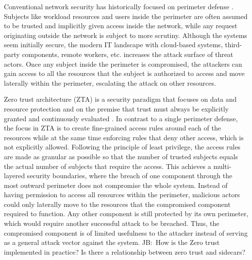 \documentclass[english, 12pt, a4paper, sci, utf8, a-2b, online]{aaltothesis}
\newcommand{\mycomment}[3]{\textcolor{#1}{#2:~#3}}
\newcommand{\jb}[1]{\noindent\mycomment{aaltoRed}{JB}{#1}}
\begin{document}
Conventional network security has historically focused on perimeter defense \cite{kerman2020implementing}.
Subjects like workload resources and users inside the perimeter are often assumed to be trusted and implicitly given access inside the network, while any request originating outside the network is subject to more scrutiny.
Although the systems seem initially secure, the modern IT landscape with cloud-based systems, third-party components, remote workers, etc. increases the attack surface of threat actors.
Once any subject inside the perimeter is compromised, the attackers can gain access to all the resources that the subject is authorized to access and move laterally within the perimeter, escalating the attack on other resources.


Zero trust architecture (ZTA) is a security paradigm that focuses on data and resource protection and on the premise that trust must always be explicitly granted and continuously evaluated \cite{kerman2020implementing, rose2020zero}. In contrast to a single perimeter defense, the focus in ZTA is to create fine-grained access rules around each of the resources while at the same time enforcing rules that deny other access, which is not explicitly allowed. Following the principle of least privilege, the access rules are made as granular as possible so that the number of trusted subjects equals the actual number of subjects that require the access. This achieves a multi-layered security boundaries, where the breach of one component through the most outward perimeter does not compromise the whole system. Instead of having permission to access all resources within the perimeter, malicious actors could only laterally move to the resources that the compromised component required to function. Any other component is still protected by its own perimeter, which would require another successful attack to be breached. Thus, the compromised component is of limited usefulness to the attacker instead of serving as a general attack vector against the system.
\jb{How is the Zero trust implemented in practice? Is there a relationship between zero trust and sidecars?}
\end{document}
